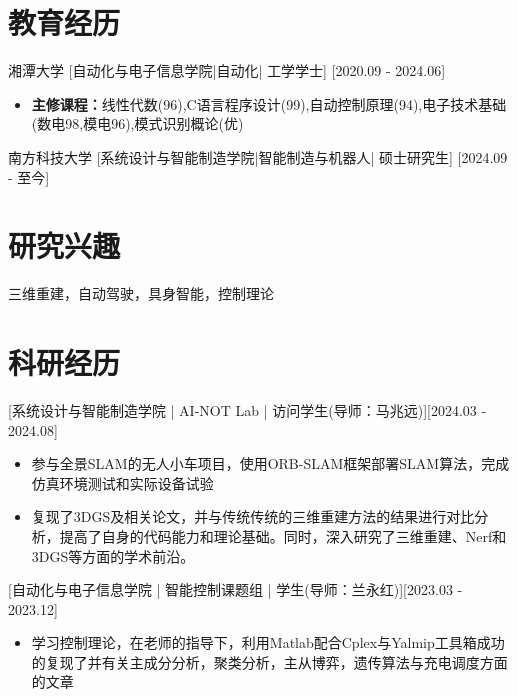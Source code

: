 \documentclass{resume}
\begin{document}

\ResumeTitle


\section{教育经历}
\ResumeItem
{湘潭大学}
[\textnormal{自动化与电子信息学院|自动化|} 工学学士]
[2020.09 - 2024.06]
\begin{itemize}
    \item \textbf{主修课程：}线性代数(96),C语言程序设计(99),自动控制原理(94),电子技术基础(数电98,模电96),模式识别概论(优)
\end{itemize}

\ResumeItem
{南方科技大学}
[\textnormal{系统设计与智能制造学院|智能制造与机器人|} 硕士研究生]
[2024.09 - 至今]
\section{研究兴趣}
三维重建，自动驾驶，具身智能，控制理论

\section{科研经历}
[系统设计与智能制造学院 | AI-NOT Lab | 访问学生(导师：马兆远)][2024.03 - 2024.08]
\begin{itemize}
    \item 参与全景SLAM的无人小车项目，使用ORB-SLAM框架部署SLAM算法，完成仿真环境测试和实际设备试验
    \item 复现了3DGS及相关论文，并与传统传统的三维重建方法的结果进行对比分析，提高了自身的代码能力和理论基础。同时，深入研究了三维重建、Nerf和3DGS等方面的学术前沿。
\end{itemize}

[自动化与电子信息学院 | 智能控制课题组 | 学生(导师：兰永红)][2023.03 - 2023.12]
\begin{itemize}
    \item 学习控制理论，在老师的指导下，利用Matlab配合Cplex与Yalmip工具箱成功的复现了并有关主成分分析，聚类分析，主从博弈，遗传算法与充电调度方面的文章
\end{itemize}
\end{document}
